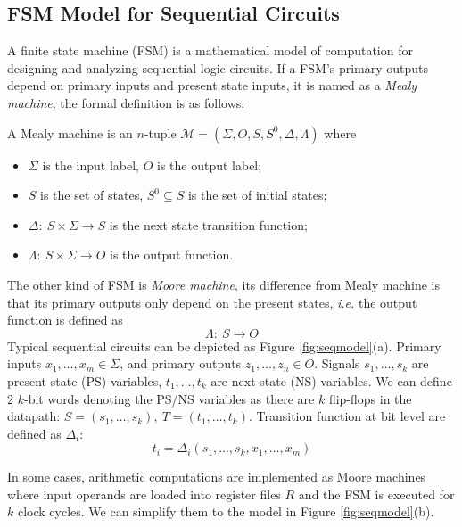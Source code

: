 \subsection{FSM Model for Sequential Circuits}
A finite state machine (FSM) is a mathematical model of computation for designing and analyzing sequential logic 
circuits. If a FSM's primary outputs depend on primary inputs and present state inputs, it is named as a \textit{Mealy machine};
the formal definition is as follows:
\begin{Definition}
A Mealy machine is an $n$-tuple $\mathcal M = (\Sigma,O,S,S^0,\Delta,\Lambda)$ where
\begin{itemize}
\item $\Sigma$ is the input label, $O$ is the output label;
\item $S$ is the set of states, $S^0\subseteq S$ is the set of initial states;
\item $\Delta:\ S\times\Sigma\to S$ is the next state transition function;
\item $\Lambda:\ S\times\Sigma\to O$ is the output function.
\end{itemize}
\end{Definition}
The other kind of FSM is \textit{Moore machine}, its difference from Mealy machine is that
its primary outputs only depend on the present states, {\it i.e.} the output function is defined as
$$\Lambda:\ S \to O$$
Typical sequential circuits can be depicted as Figure \ref{fig:seqmodel}(a). Primary inputs
$x_1,\dots,x_m \in \Sigma$, and primary outputs $z_1,\dots,z_n\in O$. Signals $s_1,\dots,s_k$ 
are present state (PS) variables, $t_1,\dots,t_k$ are next state (NS) variables.
We can define 2 $k$-bit words denoting the PS/NS variables as there are $k$ flip-flops
in the datapath: $S = (s_1,\dots,s_k), ~T=(t_1,\dots,t_k)$. Transition function
at bit level are defined as $\Delta_i$: 
$$t_i = \Delta_i(s_1,\dots,s_k,x_1,\dots,x_m)$$
\begin{figure}[H]
\end{figure}
In some cases, arithmetic computations are implemented as Moore machines where input operands
are loaded into register files $R$ and the FSM is executed for $k$ clock cycles.
We can simplify them to the model in Figure \ref{fig:seqmodel}(b).

